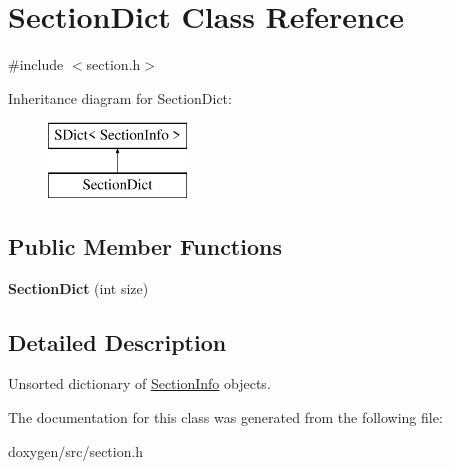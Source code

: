 \hypertarget{class_section_dict}{}\section{Section\+Dict Class Reference}
\label{class_section_dict}


{\ttfamily \#include $<$section.\+h$>$}

Inheritance diagram for Section\+Dict\+:\begin{figure}[H]
\begin{center}
\leavevmode
\includegraphics[height=2.000000cm]{class_section_dict}
\end{center}
\end{figure}
\subsection*{Public Member Functions}
\begin{DoxyCompactItemize}
\item 
\mbox{\label{class_section_dict_a8bff954afa7f270d05ff368fae048e59}} 
{\bfseries Section\+Dict} (int size)
\end{DoxyCompactItemize}


\subsection{Detailed Description}
Unsorted dictionary of \mbox{\hyperlink{struct_section_info}{Section\+Info}} objects. 

The documentation for this class was generated from the following file\+:\begin{DoxyCompactItemize}
\item 
doxygen/src/section.\+h\end{DoxyCompactItemize}

